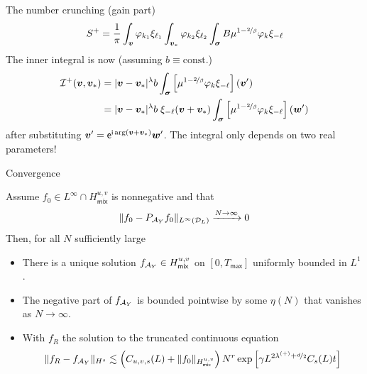 \documentclass[hyperref={bookmarksopen, colorlinks, linkcolor=blue, urlcolor=green, citecolor=red}, color={usenames,dvipsnames}]{beamer}
\begin{document}
\begin{frame}{The number crunching (gain part)}
\begin{equation*}
    S^{+} = \frac{1}{\pi} 
    \int_{{\bm v}} \varphi_{k_1} \xi_{\ell_1}
    \int_{{\bm v}_\ast} \varphi_{k_2} \xi_{\ell_2}
    \int_{\bm\sigma} B \mu^{1-\nicefrac{2}{\beta}} \varphi_k \xi_{-\ell}
\end{equation*}
The inner integral is now (assuming $b\equiv\text{const.}$)
\begin{align*}
    \mathcal{I}^+({\bm v},{\bm v}_\ast) &= |{\bm v}-{\bm v}_\ast|^\lambda b
    \int_{\bm\sigma} \left[\mu^{1-\nicefrac{2}{\beta}} \varphi_k \xi_{-\ell} \right] ({\bm v}') \\
    &= |{\bm v}-{\bm v}_\ast|^\lambda b \; \xi_{-\ell}({\bm v}+{\bm v}_\ast)
    \int_{\bm\sigma} \left[\mu^{1-\nicefrac{2}{\beta}} \varphi_k \xi_{-\ell} \right] ({\bm w}')
\end{align*}
after substituting ${\bm v}' = \mathsf{e}^{\mathsf{i} \arg({\bm v}+{\bm v}_\ast)} {\bm w}'$. The integral only depends on two real
parameters!
\end{frame}

\begin{frame}
\centering
{}
\end{frame}

\begin{frame}{Convergence}
\begin{theorem}
    Assume $f_0 \in L^\infty \cap H^{u,v}_{\mathsf{mix}}$ is nonnegative and that 
    \[
        \|f_0 - P_{\mathcal{A}_Y} f_0\|_{L^\infty(\mathcal{D}_L)} \xrightarrow{N\to\infty} 0
    \]
    Then, for all $N$ sufficiently large
    \begin{itemize}[label=]
        \item There is a unique solution $f_{\mathcal{A}_Y} \in H^{u,v}_{\mathsf{mix}}$ on $[0,T_{\mathsf{max}}]$
            uniformly bounded in $L^1$.
        \item The negative part of $f_{\mathcal{A}_Y}$ is bounded pointwise by some $\eta(N)$ that vanishes as
            $N\to\infty$.
        \item With $f_R$ the solution to the truncated continuous equation
            \[
                \|f_R - f_{\mathcal{A}_Y}\|_{H^s} \lesssim \left( C_{u,v,s}(L) + \|f_0\|_{H^{u,v}_{\mathsf{mix}}} \right)
                N^r \exp\left[ \gamma L^{2\lambda^{(+)} + \nicefrac{d}{2}} C_s(L) t \right]
            \]
    \end{itemize}
\end{theorem}
\end{frame}
\end{document}
